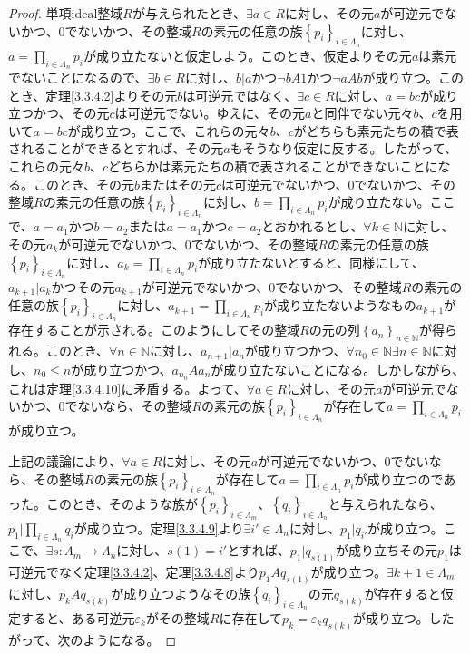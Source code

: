 \documentclass[dvipdfmx]{jsarticle}
\begin{document}
\begin{proof}
単項ideal整域$R$が与えられたとき、$\exists a \in R$に対し、その元$a$が可逆元でないかつ、$0$でないかつ、その整域$R$の素元の任意の族$\left\{ p_{i} \right\}_{i \in \varLambda_{n}}$に対し、$a = \prod_{i \in \varLambda_{n}} p_{i}$が成り立たないと仮定しよう。このとき、仮定よりその元$a$は素元でないことになるので、$\exists b \in R$に対し、$b|a$かつ$\neg bA1$かつ$\neg aAb$が成り立つ。このとき、定理\ref{3.3.4.2}よりその元$b$は可逆元ではなく、$\exists c \in R$に対し、$a = bc$が成り立つかつ、その元$c$は可逆元でない。ゆえに、その元$a$と同伴でない元々$b$、$c$を用いて$a = bc$が成り立つ。ここで、これらの元々$b$、$c$がどちらも素元たちの積で表されることができるとすれば、その元$a$もそうなり仮定に反する。したがって、これらの元々$b$、$c$どちらかは素元たちの積で表されることができないことになる。このとき、その元$b$またはその元$c$は可逆元でないかつ、$0$でないかつ、その整域$R$の素元の任意の族$\left\{ p_{i} \right\}_{i \in \varLambda_{n}}$に対し、$b = \prod_{i \in \varLambda_{n}} p_{i}$が成り立たない。ここで、$a = a_{1}$かつ$b = a_{2}$または$a = a_{1}$かつ$c = a_{2}$とおかれるとし、$\forall k \in \mathbb{N}$に対し、その元$a_{k}$が可逆元でないかつ、$0$でないかつ、その整域$R$の素元の任意の族$\left\{ p_{i} \right\}_{i \in \varLambda_{n}}$に対し、$a_{k} = \prod_{i \in \varLambda_{n}} p_{i}$が成り立たないとすると、同様にして、$a_{k + 1}|a_{k}$かつその元$a_{k + 1}$が可逆元でないかつ、$0$でないかつ、その整域$R$の素元の任意の族$\left\{ p_{i} \right\}_{i \in \varLambda_{n}}$に対し、$a_{k + 1} = \prod_{i \in \varLambda_{n}} p_{i}$が成り立たないようなもの$a_{k + 1}$が存在することが示される。このようにしてその整域$R$の元の列$\left\{ a_{n} \right\}_{n \in \mathbb{N}}$が得られる。このとき、$\forall n \in \mathbb{N}$に対し、$a_{n + 1}|a_{n}$が成り立つかつ、$\forall n_{0} \in \mathbb{N}\exists n \in \mathbb{N}$に対し、$n_{0} \leq n$が成り立つかつ、$a_{n_{0}}Aa_{n}$が成り立たないことになる。しかしながら、これは定理\ref{3.3.4.10}に矛盾する。よって、$\forall a \in R$に対し、その元$a$が可逆元でないかつ、$0$でないなら、その整域$R$の素元の族$\left\{ p_{i} \right\}_{i \in \varLambda_{n}}$が存在して$a = \prod_{i \in \varLambda_{n}} p_{i}$が成り立つ。\par
上記の議論により、$\forall a \in R$に対し、その元$a$が可逆元でないかつ、$0$でないなら、その整域$R$の素元の族$\left\{ p_{i} \right\}_{i \in \varLambda_{n}}$が存在して$a = \prod_{i \in \varLambda_{n}} p_{i}$が成り立つのであった。このとき、そのような族が$\left\{ p_{i} \right\}_{i \in \varLambda_{m}}$、$\left\{ q_{i} \right\}_{i \in \varLambda_{n}}$と与えられたなら、$p_{1}|\prod_{i \in \varLambda_{n}} q_{i}$が成り立つ。定理\ref{3.3.4.9}より$\exists i' \in \varLambda_{n}$に対し、$p_{1}|q_{i'}$が成り立つ。ここで、$\exists s:\varLambda_{m} \rightarrow \varLambda_{n}$に対し、$s(1) = i'$とすれば、$p_{1}|q_{s(1)}$が成り立ちその元$p_{1}$は可逆元でなく定理\ref{3.3.4.2}、定理\ref{3.3.4.8}より$p_{1}Aq_{s(1)}$が成り立つ。$\exists k + 1 \in \varLambda_{m}$に対し、$p_{k}Aq_{s(k)}$が成り立つようなその族$\left\{ q_{i} \right\}_{i \in \varLambda_{n}}$の元$q_{s(k)}$が存在すると仮定すると、ある可逆元$\varepsilon_{k}$がその整域$R$に存在して$p_{k} = \varepsilon_{k}q_{s(k)}$が成り立つ。したがって、次のようになる。

\end{proof}
\end{document}
